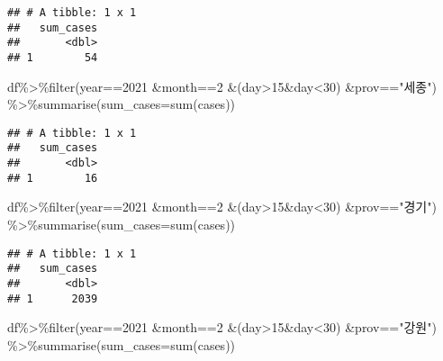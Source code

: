 \documentclass[
]{article}
\newenvironment{Shaded}{\begin{snugshade}}{\end{snugshade}}
\newcommand{\AttributeTok}[1]{\textcolor[rgb]{0.77,0.63,0.00}{#1}}
\newcommand{\DecValTok}[1]{\textcolor[rgb]{0.00,0.00,0.81}{#1}}
\newcommand{\FunctionTok}[1]{\textcolor[rgb]{0.00,0.00,0.00}{#1}}
\newcommand{\NormalTok}[1]{#1}
\newcommand{\SpecialCharTok}[1]{\textcolor[rgb]{0.00,0.00,0.00}{#1}}
\newcommand{\StringTok}[1]{\textcolor[rgb]{0.31,0.60,0.02}{#1}}
\begin{document}
\begin{verbatim}
## # A tibble: 1 x 1
##   sum_cases
##       <dbl>
## 1        54
\end{verbatim}

\begin{Shaded}
\begin{Highlighting}[]
\NormalTok{df}\SpecialCharTok{\%\textgreater{}\%}\FunctionTok{filter}\NormalTok{(year}\SpecialCharTok{==}\DecValTok{2021} \SpecialCharTok{\&}\NormalTok{month}\SpecialCharTok{==}\DecValTok{2} \SpecialCharTok{\&}\NormalTok{(day}\SpecialCharTok{\textgreater{}}\DecValTok{15}\SpecialCharTok{\&}\NormalTok{day}\SpecialCharTok{\textless{}}\DecValTok{30}\NormalTok{) }\SpecialCharTok{\&}\NormalTok{prov}\SpecialCharTok{==}\StringTok{"세종"}\NormalTok{) }\SpecialCharTok{\%\textgreater{}\%}\FunctionTok{summarise}\NormalTok{(}\AttributeTok{sum\_cases=}\FunctionTok{sum}\NormalTok{(cases))}
\end{Highlighting}
\end{Shaded}

\begin{verbatim}
## # A tibble: 1 x 1
##   sum_cases
##       <dbl>
## 1        16
\end{verbatim}

\begin{Shaded}
\begin{Highlighting}[]
\NormalTok{df}\SpecialCharTok{\%\textgreater{}\%}\FunctionTok{filter}\NormalTok{(year}\SpecialCharTok{==}\DecValTok{2021} \SpecialCharTok{\&}\NormalTok{month}\SpecialCharTok{==}\DecValTok{2} \SpecialCharTok{\&}\NormalTok{(day}\SpecialCharTok{\textgreater{}}\DecValTok{15}\SpecialCharTok{\&}\NormalTok{day}\SpecialCharTok{\textless{}}\DecValTok{30}\NormalTok{) }\SpecialCharTok{\&}\NormalTok{prov}\SpecialCharTok{==}\StringTok{"경기"}\NormalTok{) }\SpecialCharTok{\%\textgreater{}\%}\FunctionTok{summarise}\NormalTok{(}\AttributeTok{sum\_cases=}\FunctionTok{sum}\NormalTok{(cases))}
\end{Highlighting}
\end{Shaded}

\begin{verbatim}
## # A tibble: 1 x 1
##   sum_cases
##       <dbl>
## 1      2039
\end{verbatim}

\begin{Shaded}
\begin{Highlighting}[]
\NormalTok{df}\SpecialCharTok{\%\textgreater{}\%}\FunctionTok{filter}\NormalTok{(year}\SpecialCharTok{==}\DecValTok{2021} \SpecialCharTok{\&}\NormalTok{month}\SpecialCharTok{==}\DecValTok{2} \SpecialCharTok{\&}\NormalTok{(day}\SpecialCharTok{\textgreater{}}\DecValTok{15}\SpecialCharTok{\&}\NormalTok{day}\SpecialCharTok{\textless{}}\DecValTok{30}\NormalTok{) }\SpecialCharTok{\&}\NormalTok{prov}\SpecialCharTok{==}\StringTok{"강원"}\NormalTok{) }\SpecialCharTok{\%\textgreater{}\%}\FunctionTok{summarise}\NormalTok{(}\AttributeTok{sum\_cases=}\FunctionTok{sum}\NormalTok{(cases))}
\end{Highlighting}
\end{Shaded}
\end{document}
